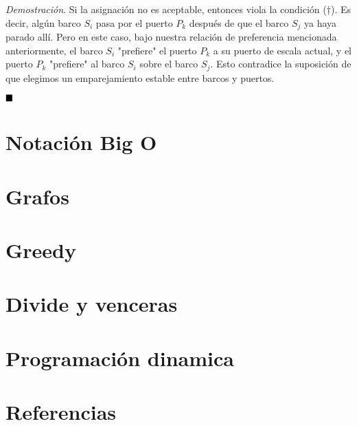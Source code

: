 \documentclass{article}
\begin{document}
\textit{Demostración}. Si la asignación no es aceptable, entonces viola la condición (†). Es decir, algún barco $S_i$ pasa por el puerto $P_k$ después de que el barco $S_j$ ya haya parado allí. Pero en este caso, bajo nuestra relación de preferencia mencionada anteriormente, el barco $S_i$ "prefiere" el puerto $P_k$ a su puerto de escala actual, y el puerto $P_k$ "prefiere" al barco $S_i$ sobre el barco $S_j$. Esto contradice la suposición de que elegimos un emparejamiento estable entre barcos y puertos.

$\hfill\blacksquare$

\newpage


\section{Notación Big O}
\section{Grafos}
\section{Greedy}
\section{Divide y venceras}
\section{Programación dinamica}
\section{Referencias}
\end{document}
